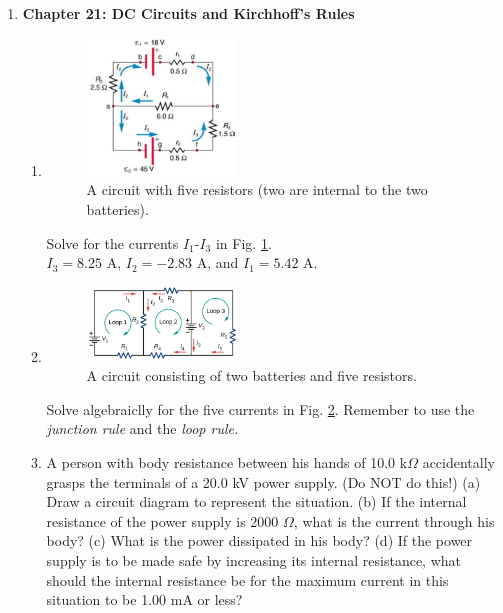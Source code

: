 \documentclass[10pt]{article}
\begin{document}
\begin{enumerate}
\item \textbf{Chapter 21: DC Circuits and Kirchhoff's Rules}
\begin{enumerate}
\item 
\begin{figure}[ht]
\centering
\includegraphics[width=0.4\textwidth]{circuit1.png}
\caption{\label{fig:circuit1} A circuit with five resistors (two are internal to the two batteries).}
\end{figure}
Solve for the currents $I_1$-$I_3$ in Fig. \ref{fig:circuit1}. \\ $I_3 = 8.25$ A, $I_2 = -2.83$ A, and $I_1 = 5.42$ A.
\item 
\begin{figure}[ht]
\centering
\includegraphics[width=0.4\textwidth]{circuit2.png}
\caption{\label{fig:circuit2} A circuit consisting of two batteries and five resistors.}
\end{figure}
Solve algebraiclly for the five currents in Fig. \ref{fig:circuit2}.  Remember to use the \textit{junction rule} and the \textit{loop rule.} \\ \vspace{4cm}
\item A person with body resistance between his hands of 10.0 k$\Omega$ accidentally grasps the terminals of a 20.0 kV power supply. (Do NOT do this!) (a) Draw a circuit diagram to represent the situation. (b) If the internal resistance of the power supply is 2000 $\Omega$, what is the current through his body? (c) What is the power dissipated in his body? (d) If the power supply is to be made safe by increasing its internal resistance, what should the internal resistance be for the maximum current in this situation to be 1.00 mA or less? \\ \vspace{3cm}

\end{enumerate}
\end{enumerate}
\end{document}
